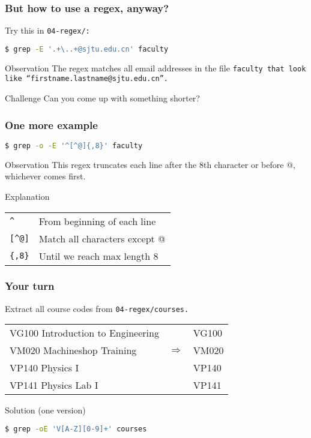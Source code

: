 \begin{frame}[fragile]
\frametitle{But how to use a regex, anyway?}
Try this in \tt{04-regex/}:
\begin{lstlisting}[language=bash]
$ grep -E '.+\..+@sjtu.edu.cn' faculty
\end{lstlisting}
\pause
\begin{block}{Observation}
    The regex matches all email addresses in the file \tt{faculty}
    that look like ``firstname.lastname@sjtu.edu.cn''.
\end{block}
\begin{block}{Challenge}
    Can you come up with something shorter?
\end{block}
\end{frame}

\begin{frame}[fragile]
\frametitle{One more example}
\begin{lstlisting}[language=bash]
$ grep -o -E '^[^@]{,8}' faculty
\end{lstlisting}
\pause
\begin{block}{Observation}
    This regex truncates each line after the 8th character or before @,
    whichever comes first.
\end{block}
\begin{block}{Explanation}
    \begin{tabular}{ll}
        \verb|^|    & From beginning of each line \\
        \verb|[^@]| & Match all characters except @ \\
        \verb|{,8}| & Until we reach max length 8
    \end{tabular}
\end{block}
\end{frame}

\begin{frame}[fragile]
\frametitle{Your turn}
Extract all course codes from \tt{04-regex/courses}. \newline

\begin{tabular}{lcl}
    VG100 Introduction to Engineering & & VG100 \\
    VM020 Machineshop Training & $\Longrightarrow$ & VM020 \\
    VP140 Physics I & & VP140 \\
    VP141 Physics Lab I & & VP141
\end{tabular}
\pause
\begin{block}{Solution (one version)}
\begin{lstlisting}[language=bash]
$ grep -oE 'V[A-Z][0-9]+' courses
\end{lstlisting}
\end{block}
\end{frame}

